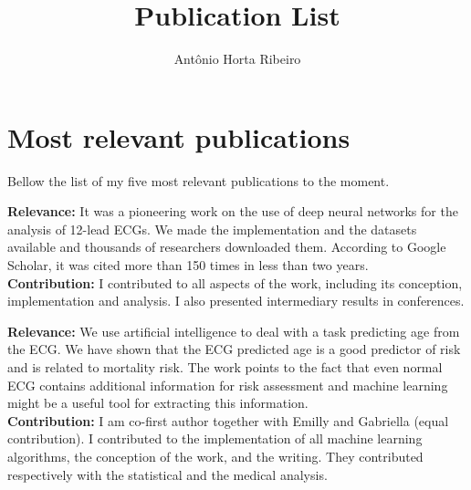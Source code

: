 \documentclass[10pt,letterpaper]{article} %
\title{Publication List}
\author{Ant\^onio Horta Ribeiro}
\begin{document}
\maketitle


\section*{Most relevant publications}

Bellow the list of my five most relevant publications to the moment.


    \begin{refsection}
      \nocite{ ribeiro_automatic_2020a }
      \setlength{\biblabelsep}{-15pt}
      \printbibliography[heading=none]
    \end{refsection}
    \begin{center}
    \begin{minipage}{17cm}
      \begin{footnotesize}
        \textbf{Relevance:}  It was a pioneering work on the use of deep neural networks for the analysis of 12-lead ECGs. We made the implementation and the datasets available and thousands of researchers downloaded them. According to Google Scholar, it was cited more than 150 times in less than two years. \\
        \textbf{Contribution: } I contributed to all aspects of the work, including its conception, implementation and analysis. I also presented intermediary results in conferences.
      \end{footnotesize}
    \end{minipage}
    \end{center}

    \begin{refsection}
      \nocite{ lima_deep_2021 }
      \setlength{\biblabelsep}{-15pt}
      \printbibliography[heading=none]
    \end{refsection}
    \begin{center}
    \begin{minipage}{17cm}
      \begin{footnotesize}
        \textbf{Relevance:}  We use artificial intelligence to deal with a task predicting age from the ECG. We have shown that the ECG predicted age is a good predictor of risk and is related to mortality risk. The work points to the fact that even normal ECG contains additional information for risk assessment and machine learning might be a useful tool for extracting this information. \\
        \textbf{Contribution: } I am co-first author together with Emilly and Gabriella (equal contribution). I contributed to the implementation of all machine learning algorithms, the conception of the work, and the writing. They contributed respectively with the statistical and the medical analysis.
      \end{footnotesize}
    \end{minipage}
    \end{center}
\end{document}
